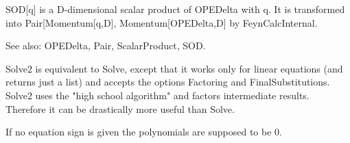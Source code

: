 


SOD[q] is a D-dimensional scalar product of OPEDelta with q. It is transformed into Pair[Momentum[q,D], Momentum[OPEDelta,D] by
  FeynCalcInternal.

See also:  OPEDelta, Pair, ScalarProduct, SOD.





\dispSFoutmath{
\{ \} 
}





Solve2 is equivalent to Solve, except that it works only for linear equations (and returns just a list) and accepts the options Factoring
  and FinalSubstitutions. Solve2 uses the "high school algorithm" and factors intermediate results. Therefore it can be drastically more
  useful than Solve.






If no equation sign is given the polynomials are supposed to be 0.



